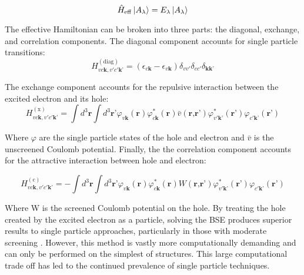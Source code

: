 \begin{equation}
\hat{H}_{\mathrm{eff}} \ket{A_\lambda} = E_\lambda \ket{A_\lambda}
\end{equation}


The effective Hamiltonian can be broken into three parts: the diagonal, exchange, and correlation components\cite{draxl_bse_2009}. 
The diagonal component accounts for single particle transitions:
\begin{equation}
	H_{v c \textbf{k}, v' c'\textbf{k'}}^{(\mathrm{diag})} = (\epsilon_{c\textbf{k}}-\epsilon_{v \textbf{k}})\delta_{vv'}\delta_{cc'}\delta_{\textbf{kk'}}
\end{equation}

The exchange component accounts for the repulsive interaction between the excited electron and its hole: 
\begin{equation}
	H_{v c \textbf{k}, v' c'\textbf{k'}}^{(\mathrm{x})} = \int d^3\textbf{r}\int d^3\textbf{r'}\varphi_{v\textbf{k}}(\textbf{r})\varphi_{c\textbf{k}}^*(\textbf{r})\bar{v}(\textbf{r,r'})\varphi_{v'\textbf{k'}}^*(\textbf{r'})\varphi_{c'\textbf{k'}}(\textbf{r'})
\end{equation}

Where $\varphi$ are the single particle states of the hole and electron and $\bar{v}$ is the unscreened Coulomb potential.  Finally, the the correlation component accounts for the attractive interaction between hole and electron:

\begin{equation}
	H_{v c \textbf{k}, v' c'\textbf{k'}}^{(\mathrm{c})} = -\int d^3\textbf{r}\int d^3\textbf{r'}\varphi_{v\textbf{k}}(\textbf{r})\varphi_{c\textbf{k}}^*(\textbf{r})W(\textbf{r,r'})\varphi_{v'\textbf{k'}}^*(\textbf{r'})\varphi_{c'\textbf{k'}}(\textbf{r'})
\end{equation}

Where W is the screened Coulomb potential on the hole. By treating the hole created by the excited electron as a particle, solving the BSE produces superior results to single particle approaches, particularly in those with moderate screening \cite{draxl_bse_2009}.  However, this method is vastly more computationally demanding and can only be performed on the simplest of structures.   This large computational trade off has led to the continued prevalence of single particle techniques.


